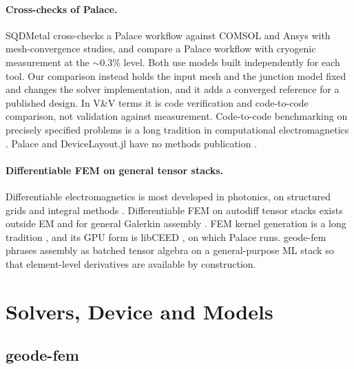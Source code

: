 \documentclass{anvil-paper}
\begin{document}
\paragraph{Cross-checks of Palace.}
SQDMetal \citep{sommers2025open} cross-checks a Palace workflow against
COMSOL and Ansys with mesh-convergence studies, and
\citet{ye2025electromagnetic} compare a Palace workflow with cryogenic
measurement at the ${\sim}0.3\%$ level. Both use models built
independently for each tool. Our comparison instead holds the input mesh
and the junction model fixed and changes the solver implementation, and it
adds a converged reference for a published design. In V\&V terms
\citep{roache1997quantification,oberkampf2010verification} it is code
verification and code-to-code comparison, not validation against
measurement. Code-to-code benchmarking on precisely specified problems is
a long tradition in computational electromagnetics
\citep{hoffmann2009comparison}. Palace and DeviceLayout.jl have no methods
publication \citep{palace,palace-blog,devicelayout,devicelayout-blog,devicelayout-juliacon}.

\paragraph{Differentiable FEM on general tensor stacks.}
Differentiable electromagnetics is most developed in photonics, on
structured grids and integral methods
\citep{molesky2018inverse,hughes2019forward,hammond2022high,schubert2022inverse,mahlau2026fdtdx,ponomareva2025torchgdm,kim2024meent}.
Differentiable FEM on autodiff tensor stacks exists outside EM
\citep{xue2023jax,liang2023pytorch} and for general Galerkin assembly
\citep{wen2026learning,chi2026torch}. FEM kernel generation is a long
tradition \citep{kirby2006compiler,alnaes2014unified,rathgeber2017firedrake,homolya2018tsfc},
and its GPU form is libCEED \citep{brown2021libceed}, on which Palace
runs. geode-fem phrases assembly as batched tensor algebra on a
general-purpose ML stack \citep{ragankelley2013halide,chen2018tvm} so
that element-level derivatives are available by construction.

\section{Solvers, Device and Models}
\label{sec:setup}

\subsection{geode-fem}
\label{sec:architecture}
\end{document}
